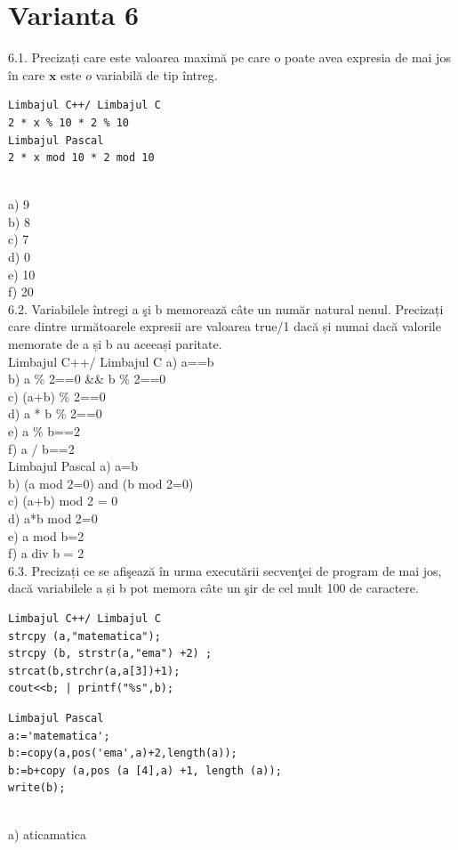 \section*{Varianta 6}

6.1. Precizați care este valoarea maximă pe care o poate avea expresia de mai jos în care $\mathbf{x}$ este $o$ variabilă de tip întreg.
\begin{verbatim}
Limbajul C++/ Limbajul C
2 * x % 10 * 2 % 10
Limbajul Pascal
2 * x mod 10 * 2 mod 10
\end{verbatim}
\\
a) 9
\\
b) 8
\\
c) 7
\\
d) 0
\\
e) 10
\\
f) 20
\\
6.2. Variabilele întregi a şi b memorează câte un număr natural nenul. Precizați care dintre următoarele expresii are valoarea true/1 dacă și numai dacă valorile memorate de a și b au aceeași paritate.
\\
Limbajul C++/ Limbajul C
a) a==b
\\
b) a \% 2==0 \&\& b \% 2==0
\\
c) (a+b) \% 2==0
\\
d) a * b \% 2==0
\\
e) a \% b==2
\\
f) a / b==2
\\
Limbajul Pascal
a) a=b
\\
b) (a mod 2=0) and (b mod 2=0)
\\ 
c) (a+b) mod 2 = 0
\\
d) a*b mod 2=0
\\
e) a mod b=2
\\
f) a div b = 2
\\
6.3. Precizați ce se afişează în urma executării secvenţei de program de mai jos, dacă variabilele a și b pot memora câte un şir de cel mult 100 de caractere.
\begin{verbatim}
Limbajul C++/ Limbajul C
strcpy (a,"matematica");
strcpy (b, strstr(a,"ema") +2) ;
strcat(b,strchr(a,a[3])+1);
cout<<b; | printf("%s",b);
\end{verbatim}
\begin{verbatim}
Limbajul Pascal
a:='matematica';
b:=copy(a,pos('ema',a)+2,length(a));
b:=b+copy (a,pos (a [4],a) +1, length (a));
write(b);
\end{verbatim}
\\
a) aticamatica
\\
